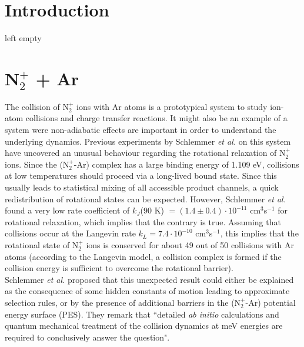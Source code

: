 \documentclass[journal=jacsat,manuscript=article]{achemso}
\author{Markus Meuwly}
\affiliation{Department of Chemistry, University of Basel, Klingelbergstrasse 80, CH-4056 Basel, Switzerland.}
\date{\today}
\title{}
\begin{document}
\begin{abstract}

\end{abstract}

\clearpage

\section{Introduction}
\label{sec:introduction} 
left empty

\section{N$_2^+$ + Ar}
\label{sec:n2plusar}
The collision of N$_2^+$ ions with Ar atoms is a prototypical system to study ion-atom collisions and charge transfer reactions. It might also be an example of a system were non-adiabatic effects are important in order to understand the underlying dynamics. Previous experiments by Schlemmer \textit{et al.}\cite{schlemmer.ijms.1999.n2plusargon} on this system have uncovered an unusual behaviour regarding the rotational relaxation of N$_2^+$ ions.
Since the (N$_2^+$-Ar) complex has a large binding energy of 1.109 eV\cite{mahnert.jcp.1995.n2plusargon}, collisions at low temperatures should proceed via a long-lived bound state. Since this usually leads to statistical mixing of all accessible product channels, a quick redistribution of rotational states can be expected. However, Schlemmer \textit{et al.} found a very low rate coefficient of $k_J$(90 K) $= (1.4\pm 0.4) \cdot 10^{-11}$ cm$^3$s$^{-1}$ for rotational relaxation, which implies that the contrary is true. Assuming that collisions occur at the Langevin rate $k_L = 7.4\cdot10^{-10}$ cm$^3$s$^{-1}$, this implies that the rotational state of N$_2^+$ ions is conserved for about 49 out of 50 collisions with Ar atoms (according to the Langevin model, a collision complex is formed if the collision energy is sufficient to overcome the rotational barrier).\cite{schlemmer.ijms.1999.n2plusargon}\\
\noindent Schlemmer \textit{et al.} proposed that this unexpected result could either be explained as the consequence of some hidden constants of motion leading to approximate selection rules, or by the presence of additional barriers in the (N$_2^+$-Ar) potential energy surface (PES). They remark that ``detailed \textit{ab initio} calculations and quantum mechanical treatment of the collision dynamics at meV energies are required to conclusively answer the question".\cite{schlemmer.ijms.1999.n2plusargon}\\
\end{document}
